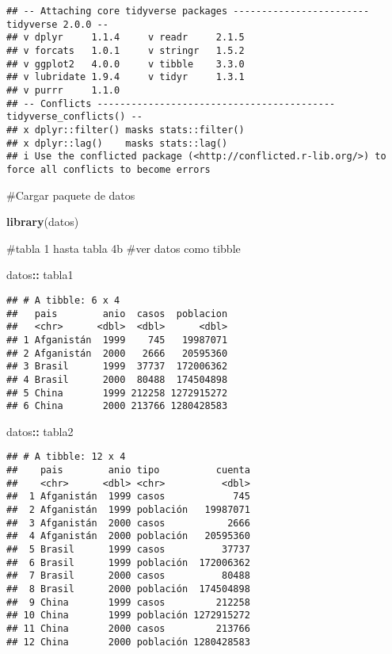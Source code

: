 \documentclass[
]{article}
\newenvironment{Shaded}{\begin{snugshade}}{\end{snugshade}}
\newcommand{\FunctionTok}[1]{\textcolor[rgb]{0.13,0.29,0.53}{\textbf{#1}}}
\newcommand{\NormalTok}[1]{#1}
\newcommand{\SpecialCharTok}[1]{\textcolor[rgb]{0.81,0.36,0.00}{\textbf{#1}}}
\begin{document}
\begin{verbatim}
## -- Attaching core tidyverse packages ------------------------ tidyverse 2.0.0 --
## v dplyr     1.1.4     v readr     2.1.5
## v forcats   1.0.1     v stringr   1.5.2
## v ggplot2   4.0.0     v tibble    3.3.0
## v lubridate 1.9.4     v tidyr     1.3.1
## v purrr     1.1.0     
## -- Conflicts ------------------------------------------ tidyverse_conflicts() --
## x dplyr::filter() masks stats::filter()
## x dplyr::lag()    masks stats::lag()
## i Use the conflicted package (<http://conflicted.r-lib.org/>) to force all conflicts to become errors
\end{verbatim}

\#Cargar paquete de datos

\begin{Shaded}
\begin{Highlighting}[]
\FunctionTok{library}\NormalTok{(datos)}
\end{Highlighting}
\end{Shaded}

\#tabla 1 hasta tabla 4b \#ver datos como tibble

\begin{Shaded}
\begin{Highlighting}[]
\NormalTok{datos}\SpecialCharTok{::}\NormalTok{ tabla1}
\end{Highlighting}
\end{Shaded}

\begin{verbatim}
## # A tibble: 6 x 4
##   pais        anio  casos  poblacion
##   <chr>      <dbl>  <dbl>      <dbl>
## 1 Afganistán  1999    745   19987071
## 2 Afganistán  2000   2666   20595360
## 3 Brasil      1999  37737  172006362
## 4 Brasil      2000  80488  174504898
## 5 China       1999 212258 1272915272
## 6 China       2000 213766 1280428583
\end{verbatim}

\begin{Shaded}
\begin{Highlighting}[]
\NormalTok{datos}\SpecialCharTok{::}\NormalTok{ tabla2}
\end{Highlighting}
\end{Shaded}

\begin{verbatim}
## # A tibble: 12 x 4
##    pais        anio tipo          cuenta
##    <chr>      <dbl> <chr>          <dbl>
##  1 Afganistán  1999 casos            745
##  2 Afganistán  1999 población   19987071
##  3 Afganistán  2000 casos           2666
##  4 Afganistán  2000 población   20595360
##  5 Brasil      1999 casos          37737
##  6 Brasil      1999 población  172006362
##  7 Brasil      2000 casos          80488
##  8 Brasil      2000 población  174504898
##  9 China       1999 casos         212258
## 10 China       1999 población 1272915272
## 11 China       2000 casos         213766
## 12 China       2000 población 1280428583
\end{verbatim}
\end{document}
